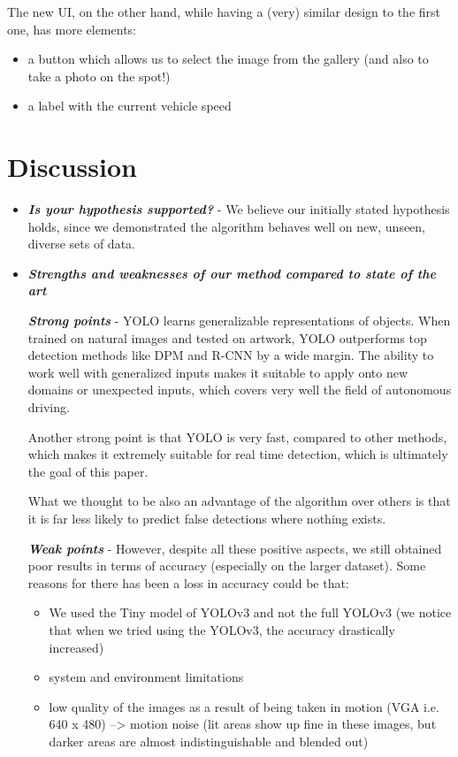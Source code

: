 \documentclass[runningheads,a4paper,11pt]{report}
\begin{document}
The new UI, on the other hand, while having a (very) similar design to the first one, has more elements:
\begin{itemize}
    \item a button which allows us to select the image from the gallery (and also to take a photo on the spot!)
    \item a label with the current vehicle speed
\end{itemize}

\section{Discussion}
\label{section:discussion}

\begin{itemize}
	\item \textbf{\emph{Is your hypothesis supported?}} - We believe our initially stated hypothesis holds, since we demonstrated the algorithm behaves well on new, unseen, diverse sets of data.
	\item \textbf{\emph{Strengths and weaknesses of our method compared to state of the art}} 
	
	\textbf{\emph{Strong points}} - YOLO learns generalizable representations of objects. When trained on natural images and tested on artwork, YOLO outperforms top detection methods like DPM and R-CNN by a wide margin. The ability to work well with generalized inputs makes it suitable to apply onto new domains or unexpected inputs, which covers very well the field of autonomous driving. 
	
	Another strong point is that YOLO is very fast, compared to other methods, which makes it extremely suitable for real time detection, which is ultimately the goal of this paper.
	
	What we thought to be also an advantage of the algorithm over others is that it is far less likely to predict false detections where nothing exists.
	
	\textbf{\emph{Weak points}} -
	However, despite all these positive aspects, we still obtained poor results in terms of accuracy (especially on the larger dataset). Some reasons for there has been a loss in accuracy could be that:
	\begin{itemize}
	    \item We used the Tiny model of YOLOv3 and not the full YOLOv3 (we notice that when we tried using the YOLOv3, the accuracy drastically increased)
	    \item system and environment limitations
	    \item low quality of the images as a result of being taken in motion (VGA i.e. 640 x 480) --> motion noise (lit areas show up fine in these images, but darker areas are almost indistinguishable and blended out)
	\end{itemize}
	

\end{itemize}
\end{document}
